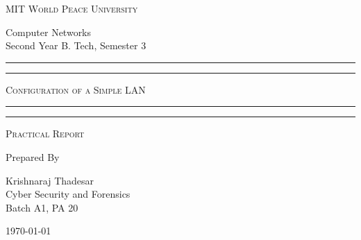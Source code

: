 \documentclass[11pt]{article}
\begin{document}
	
	\begin{titlepage} 
		\centering 
		
		
		\huge\textsc{
			MIT World Peace University
		}\\
	
		\vspace{0.75\baselineskip} %
		
		\LARGE{
			Computer Networks\\
			Second Year B. Tech, Semester 3
		}
		
		\vfill %
		
		
		\rule{\textwidth}{1.6pt}\vspace*{-\baselineskip}\vspace*{2pt}
		\rule{\textwidth}{0.6pt}
		\vspace{0.75\baselineskip} %
		
		
		
		\huge{\textsc{
			Configuration of a Simple LAN
			}} \\
		
		
		
		\vspace{0.5\baselineskip} %
		\rule{\textwidth}{0.6pt}\vspace*{-\baselineskip}\vspace*{2.8pt}
		\rule{\textwidth}{1.6pt}
		
		\vspace{1\baselineskip} %

			
		\LARGE\textsc{
			Practical Report
		} %
		\vfill
		
		
		Prepared By
		\vspace{0.5\baselineskip} %
		
		\Large{
			Krishnaraj Thadesar \\
			Cyber Security and Forensics\\
			Batch A1, PA 20
		}
		
		
		\vspace{0.5\baselineskip} %
		\today

	\end{titlepage}
	
\end{document}
